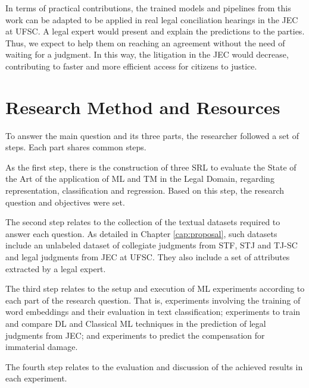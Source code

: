 In terms of practical contributions, the trained models and pipelines from this work can be adapted to be applied in real legal conciliation hearings in the \gls{JEC} at \gls{UFSC}. A legal expert would present and explain the predictions to the parties. Thus, we expect to help them on reaching an agreement without the need of waiting for a judgment. In this way, the litigation in the \gls{JEC} would decrease, contributing to faster and more efficient access for citizens to justice.

\section{Research Method and Resources}

% 

To answer the main question and its three parts, the researcher followed a set of steps. Each part shares common steps.

As the first step, there is the construction of three \gls{SRL} to evaluate the State of the Art of the application of \gls{ML} and \gls{TM} in the Legal Domain, regarding representation, classification and regression. Based on this step, the research question and objectives were set.

The second step relates to the collection of the textual datasets required to answer each question. As detailed in Chapter \ref{cap:proposal}, such datasets include an unlabeled dataset of collegiate judgments from \gls{STF}, \gls{STJ} and \gls{TJ-SC} and legal judgments from \gls{JEC} at \gls{UFSC}. They also include a set of attributes extracted by a legal expert.

The third step relates to the setup and execution of \gls{ML} experiments according to each part of the research question. That is, experiments involving the training  of word embeddings and their evaluation in text classification; experiments to train and compare \gls{DL} and Classical \gls{ML} techniques in the prediction of legal judgments from \gls{JEC}; and experiments to predict the compensation for immaterial damage.

The fourth step relates to the evaluation and discussion of the achieved  results in each experiment.

